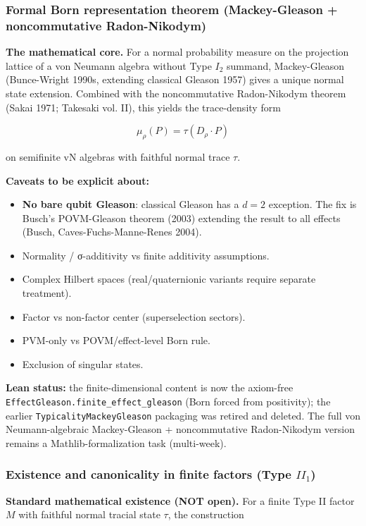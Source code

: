 \documentclass[11pt,a4paper]{article}
\begin{document}
\subsubsection{Formal Born representation theorem (Mackey-Gleason + noncommutative Radon-Nikodym)}

\textbf{The mathematical core.} For a normal probability measure on the projection lattice of a von Neumann algebra without Type $I_2$ summand, Mackey-Gleason (Bunce-Wright 1990s, extending classical Gleason 1957) gives a unique normal state extension. Combined with the noncommutative Radon-Nikodym theorem (Sakai 1971; Takesaki vol. II), this yields the trace-density form

\[
\mu_\rho(P) = \tau(D_\rho \cdot P)
\]

on semifinite vN algebras with faithful normal trace $\tau$.

\textbf{Caveats to be explicit about:}
\begin{itemize}
  \item \textbf{No bare qubit Gleason}: classical Gleason has a $d=2$ exception. The fix is Busch's POVM-Gleason theorem (2003) extending the result to all effects (Busch, Caves-Fuchs-Manne-Renes 2004).
  \item Normality / σ-additivity vs finite additivity assumptions.
  \item Complex Hilbert spaces (real/quaternionic variants require separate treatment).
  \item Factor vs non-factor center (superselection sectors).
  \item PVM-only vs POVM/effect-level Born rule.
  \item Exclusion of singular states.
\end{itemize}

\textbf{Lean status:} the finite-dimensional content is now the axiom-free \texttt{EffectGleason.finite\_effect\_gleason} (Born forced from positivity); the earlier \texttt{TypicalityMackeyGleason} packaging was retired and deleted. The full von Neumann-algebraic Mackey-Gleason + noncommutative Radon-Nikodym version remains a Mathlib-formalization task (multi-week).

\subsubsection{Existence and canonicality in finite factors (Type $II_1$)}

\textbf{Standard mathematical existence (NOT open).} For a finite Type II factor $M$ with faithful normal tracial state $\tau$, the construction
\end{document}
